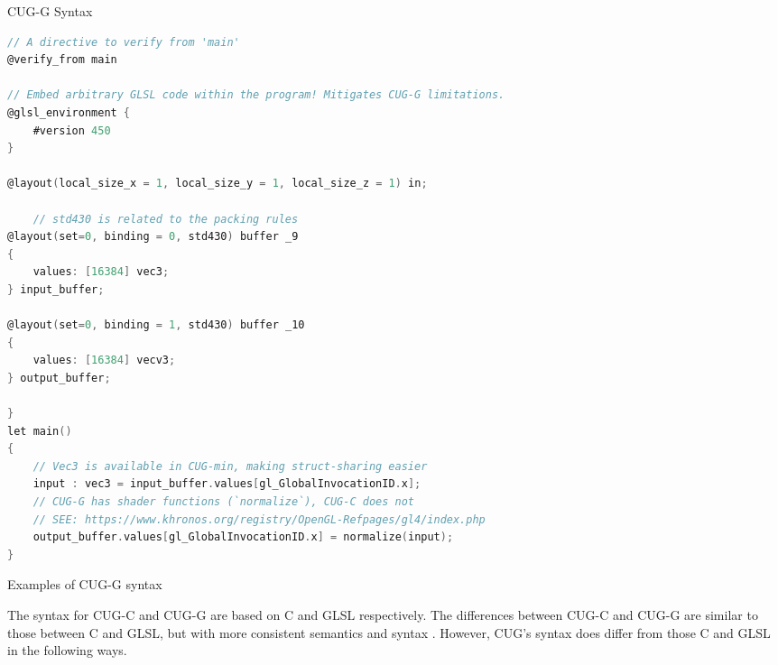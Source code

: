 \documentclass[a4paper,12pt,twoside,openright]{report}
\begin{document}
\begin{lstfloat}
\begin{center} CUG-G Syntax\end{center}
\begin{lstlisting}[language=C]
// A directive to verify from 'main'
@verify_from main

// Embed arbitrary GLSL code within the program! Mitigates CUG-G limitations.
@glsl_environment {
    #version 450
}

@layout(local_size_x = 1, local_size_y = 1, local_size_z = 1) in;

    // std430 is related to the packing rules
@layout(set=0, binding = 0, std430) buffer _9
{
    values: [16384] vec3;
} input_buffer;

@layout(set=0, binding = 1, std430) buffer _10
{
    values: [16384] vecv3;
} output_buffer;

}
let main()
{
    // Vec3 is available in CUG-min, making struct-sharing easier
    input : vec3 = input_buffer.values[gl_GlobalInvocationID.x];
    // CUG-G has shader functions (`normalize`), CUG-C does not
    // SEE: https://www.khronos.org/registry/OpenGL-Refpages/gl4/index.php
    output_buffer.values[gl_GlobalInvocationID.x] = normalize(input);
}
\end{lstlisting}
\caption{Examples of CUG-G syntax}
\label{lst:cug_g_syntax}
\end{lstfloat}

The syntax for CUG-C and CUG-G are based on C and GLSL respectively. The
differences between CUG-C and CUG-G are similar to those between C and GLSL,
but with more consistent semantics and syntax \cite{MissingInGLSL}. However,
CUG's syntax does differ from those C and GLSL in the following ways.
\end{document}

